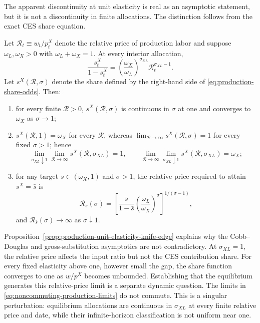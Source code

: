 The apparent discontinuity at unit elasticity is real as an asymptotic statement,
but it is not a discontinuity in finite allocations. The distinction follows from
the exact CES share equation.

\begin{proposition}
\label{prop:production-unit-elasticity-knife-edge}
Let $\mathcal R_t\equiv w_t/p^X_t$ denote the relative price of production labor
and suppose $\omega_L,\omega_X>0$ with
$\omega_L+\omega_X=1$. At every interior allocation,
\begin{equation}
    \frac{s^X_t}{1-s^X_t}
    =
    \left(\frac{\omega_X}{\omega_L}\right)^{\sigma_{XL}}
    \mathcal R_t^{\sigma_{XL}-1}.
    \label{eq:production-share-odds}
\end{equation}
Let $s^X(\mathcal R,\sigma)$ denote the share defined by the right-hand side of
\eqref{eq:production-share-odds}. Then:
\begin{enumerate}[label=(\roman*)]
    \item for every finite $\mathcal R>0$, $s^X(\mathcal R,\sigma)$ is continuous in $\sigma$ at one
    and converges to $\omega_X$ as $\sigma\to1$;
    \item $s^X(\mathcal R,1)=\omega_X$ for every $\mathcal R$, whereas
    $\lim_{\mathcal R\to\infty}s^X(\mathcal R,\sigma)=1$ for every fixed $\sigma>1$; hence
    \begin{equation}
            \lim_{\sigma_{XL}\downarrow1}\lim_{\mathcal R\to\infty}s^X(\mathcal R,\sigma_{XL})=1,
        \qquad
            \lim_{\mathcal R\to\infty}\lim_{\sigma_{XL}\downarrow1}s^X(\mathcal R,\sigma_{XL})
        =\omega_X;
        \label{eq:noncommuting-production-limits}
    \end{equation}
    \item for any target $\bar s\in(\omega_X,1)$ and
    $\sigma>1$, the relative price required to attain $s^X=\bar s$ is
    \begin{equation}
        \mathcal R_{\bar s}(\sigma)
        =
        \left[
            \frac{\bar s}{1-\bar s}
            \left(\frac{\omega_L}{\omega_X}\right)^{\sigma}
        \right]^{1/(\sigma-1)},
        \label{eq:production-share-threshold}
    \end{equation}
    and $\mathcal R_{\bar s}(\sigma)\to\infty$ as $\sigma\downarrow1$.
\end{enumerate}
\end{proposition}

Proposition~\ref{prop:production-unit-elasticity-knife-edge} explains why the
Cobb--Douglas and gross-substitution asymptotics are not contradictory. At
$\sigma_{XL}=1$, the relative price affects the input ratio but not the CES
contribution share. For every fixed elasticity above one, however small the gap,
the share function converges to one as $w/p^X$ becomes unbounded. Establishing that
the equilibrium generates this relative-price limit is a separate dynamic question. The limits
in \eqref{eq:noncommuting-production-limits} do not commute. This is a singular
perturbation: equilibrium allocations are continuous in $\sigma_{XL}$ at every
finite relative price and date, while their infinite-horizon classification is not
uniform near one.

